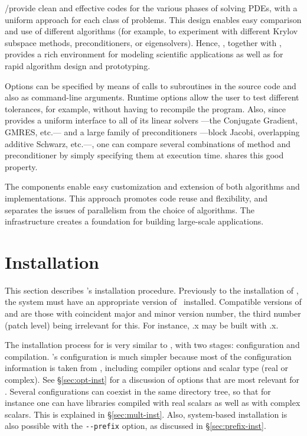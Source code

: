 	\petsc/\slepc provide clean and effective codes for the various phases of solving PDEs, with a uniform approach for each class of problems.  This design enables easy comparison and use of different algorithms (for example, to experiment with different Krylov subspace methods, preconditioners, or eigensolvers). Hence, \petsc, together with \slepc, provides a rich environment for modeling scientific applications as well as for rapid algorithm design and prototyping.

	Options can be specified by means of calls to subroutines in the source code and also as command-line arguments. Runtime options allow the user to test different tolerances, for example, without having to recompile the program. Also, since \petsc provides a uniform interface to all of its linear solvers ---the Conjugate Gradient, GMRES, etc.--- and a large family of preconditioners ---block Jacobi, overlapping additive Schwarz, etc.---, one can compare several combinations of method and preconditioner by simply specifying them at execution time. \slepc shares this good property.
	
	The components enable easy customization and extension of both algorithms and implementations. This approach promotes code reuse and flexibility, and separates the issues of parallelism from the choice of algorithms.  The \petsc infrastructure creates a foundation for building large-scale applications.

\section{Installation}
\label{sec:inst}

	This section describes \slepc's installation procedure.
	Previously to the installation of \slepc, the system must have an appropriate version of \petsc\ installed. Compatible versions of \petsc and \slepc are those with coincident major and minor version number, the third number (patch level) being irrelevant for this. For instance, .x may be built with .x.

	The installation process for \slepc is very similar to \petsc, with two stages: configuration and compilation. \slepc's configuration is much simpler because most of the configuration information is taken from \petsc, including compiler options and scalar type (real or complex). See \S\ref{sec:opt-inst} for a discussion of options that are most relevant for \slepc. Several configurations can coexist in the same directory tree, so that for instance one can have \slepc libraries compiled with real scalars as well as with complex scalars. This is explained in \S\ref{sec:mult-inst}. Also, system-based installation is also possible with the \Verb!--prefix! option, as discussed in \S\ref{sec:prefix-inst}.

